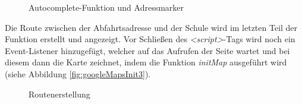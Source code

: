 \begin{figure}[!h]
	\caption{Autocomplete-Funktion und Adressmarker}
	\label{fig:googleMapsInit2}
\end{figure}

Die Route zwischen der Abfahrtsadresse und der Schule wird im letzten Teil der Funktion erstellt und angezeigt. Vor Schließen des \textit{<script>}-Tags wird noch ein Event-Listener hinzugefügt, welcher auf das Aufrufen der Seite wartet und bei diesem dann die Karte zeichnet, indem die Funktion \textit{initMap} ausgeführt wird (siehe Abbildung \vref{fig:googleMapsInit3}).

\begin{figure}[!h]
	\caption{Routenerstellung}
	\label{fig:googleMapsInit3}
\end{figure}

